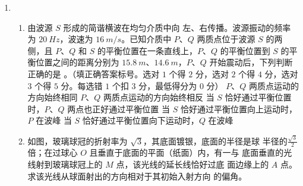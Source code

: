 \begin{enumerate}
\begin{enumerate}



 \end{enumerate}


\item 
{}
\begin{enumerate}
	\item
由波源 $ S $ 形成的简谐横波在均匀介质中向
左、右传播。波源振动的频率为 $ 20 \ Hz $，波速为 $ 16 \ m /s $。已知介质中 $ P $、$ Q $ 两质点位于波源 $ S $ 的两
侧，且 $ P $、$ Q $ 和 $ S $ 的平衡位置在一条直线上，$ P $、$ Q $ 的平衡位置到 $ S $ 的平衡位置之间的距离分别为
$ 15.8 \ m $、$ 14.6 \ m $，$ P $、$ Q $ 开始震动后，下列判断正确的是 \underlinegap 。（填正确答案标号。选对 $ 1 $ 个得 $ 2 $
分，选对 $ 2 $ 个得 $ 4 $ 分，选对 $ 3 $ 个得 $ 5 $ 分。每选错 $ 1 $ 个扣 $ 3 $ 分，最低得分为 $ 0 $ 分）
\fivechoices
{$ P $、$ Q $ 两质点运动的方向始终相同}
{$ P $、$ Q $ 两质点运动的方向始终相反}
{当 $ S $ 恰好通过平衡位置时，$ P $、$ Q $ 两点也正好通过平衡位置}
{当 $ S $ 恰好通过平衡位置向上运动时，$ P $ 在波峰}
{当 $ S $ 恰好通过平衡位置向下运动时，$ Q $ 在波峰}


\item 
如图，玻璃球冠的折射率为 $ \sqrt{3} $，其底面镀银，底面的半径是球
半径的$ \frac{\sqrt{3}}{2} $倍；在过球心 $ O $ 且垂直于底面的平面（纸面）内，有一与
底面垂直的光线射到玻璃球冠上的 $ M $ 点，该光线的延长线恰好过底
面边缘上的 $ A $ 点。求该光线从球面射出的方向相对于其初始入射方向
的偏角。
\begin{figure}[h!]
	\flushright
	
\end{figure}


\end{enumerate}
\end{enumerate}
